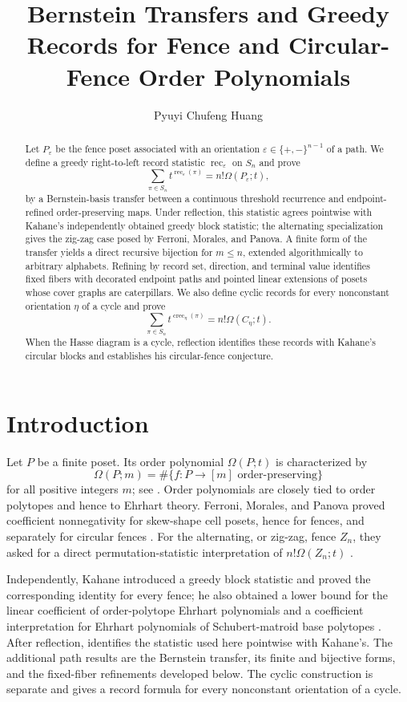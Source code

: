\documentclass[11pt,letterpaper,reqno]{amsart}
\title[Bernstein transfers and greedy records]
{Bernstein Transfers and Greedy Records for
Fence and Circular-Fence Order Polynomials}
\author{Pyuyi Chufeng Huang}
\theoremstyle{definition}
\DeclareMathOperator{\rec}{rec}
\newcommand{\eps}{\varepsilon}
\begin{document}
\begin{abstract}
Let \(P_\eps\) be the fence poset associated with an orientation \(\eps\in\{+,-\}^{n-1}\) of a path.  We define a greedy right-to-left record statistic \(\rec_\eps\) on \(S_n\) and prove
\[
\sum_{\pi\in S_n}t^{\rec_\eps(\pi)}=n!\Omega(P_\eps;t),
\]
by a Bernstein-basis transfer between a continuous threshold recurrence and endpoint-refined order-preserving maps.  Under reflection, this statistic agrees pointwise with Kahane's independently obtained greedy block statistic; the alternating specialization gives the zig-zag case posed by Ferroni, Morales, and Panova.  A finite form of the transfer yields a direct recursive bijection for \(m\le n\), extended algorithmically to arbitrary alphabets. Refining by record set, direction, and terminal value identifies fixed fibers with decorated endpoint paths and pointed linear extensions of posets whose cover graphs are caterpillars.  We also define cyclic records for every nonconstant orientation \(\eta\) of a cycle and prove
\[
\sum_{\pi\in S_n}t^{\operatorname{crec}_\eta(\pi)}
=n!\Omega(C_\eta;t).
\]
When the Hasse diagram is a cycle, reflection identifies these records with Kahane's circular blocks and establishes his circular-fence conjecture.
\end{abstract}

\maketitle

\section{Introduction}

Let \(P\) be a finite poset.  Its order polynomial \(\Omega(P;t)\) is
characterized by
\[
\Omega(P;m)=\#\{f:P\to[m]\text{ order-preserving}\}
\]
for all positive integers \(m\); see \cite[Chapter~3]{StanleyEC1}.  Order
polynomials are closely tied to order polytopes
\cite{StanleyTwoPosetPolytopes} and hence to Ehrhart theory.  Ferroni,
Morales, and Panova proved coefficient nonnegativity for skew-shape cell posets,
hence for fences, and separately for circular fences
\cite[Corollary~5.1 and Theorem~7.7]{FMP}.  For the alternating, or zig-zag,
fence \(Z_n\), they asked for a direct permutation-statistic interpretation of
\(n!\Omega(Z_n;t)\) \cite[Problem~5.3]{FMP}.

Independently, Kahane introduced a greedy block statistic and proved the
corresponding identity for every fence; he also obtained a lower bound for the
linear coefficient of order-polytope Ehrhart polynomials and a coefficient
interpretation for Ehrhart polynomials of Schubert-matroid base polytopes
\cite[Sections~5 and 6]{Kahane}.  After reflection,
 identifies the statistic used here
pointwise with Kahane's.  The additional path results are the Bernstein
transfer, its finite and bijective forms, and the fixed-fiber refinements
developed below.  The cyclic construction is separate and gives a record
formula for every nonconstant orientation of a cycle.
\end{document}

